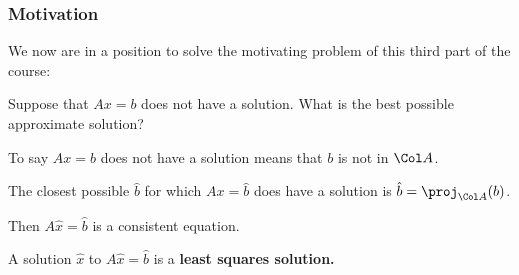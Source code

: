 
\usetikzlibrary{decorations.pathreplacing,math}




\begin{frame}
\frametitle{Motivation}

We now are in a position to solve the motivating problem of this third part of
the course:

\pause\medskip
\begin{bluebox}[Problem]{.7\linewidth}
  Suppose that $Ax=b$ does not have a solution.  What is the best possible
  approximate solution?
\end{bluebox}

\pause\medskip
To say $Ax=b$ does not have a solution means that $b$ is not in $\Col A$.

\pause\medskip
The closest possible $\hat b$ for which $Ax = \hat b$ does have a solution is
\pause
$\hat b = \proj_{\Col A}(b)$.

\pause\medskip
Then $A\hat x = \hat b$ is a consistent equation.

\pause\medskip
A solution $\hat x$ to $A\hat x = \hat b$ is a \textbf{least squares solution.}

\end{frame}



